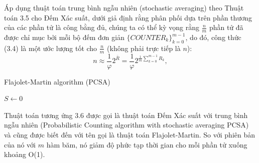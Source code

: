 \documentclass[a4paper,13pt]{article}
\theoremstyle{mytheor}
\begin{document}
Áp dụng thuật toán trung bình ngẫu nhiên (stochastic averaging) theo Thuật toán 3.5 cho Đếm Xác suất, 
dưới giả định rằng phân phối dựa trên phần thương của các phần tử là công bằng đủ, chúng ta có thể kỳ vọng rằng $\frac{n}{m}$ phần tử đã được 
chỉ mục bởi mỗi bộ đếm đơn giản $\{COUNTER_k\}_{k=0}^{m-1}$, do đó, công thức (3.4) là một ước lượng tốt cho $\frac{n}{m}$ (không phải trực tiếp là $n$):
\[n \approx \frac{1}{\varphi}2^{\bar{R}} = \frac{1}{\varphi}2^{\frac{1}{m}{\sum\limits_{k=0}^{m-1}R_k}},\]
\begin{algorithm}[H]
    \DontPrintSemicolon
    \LinesNumberedHidden
    \caption[]{Flajolet-Martin algorithm (PCSA)}
    $S \gets $0
\end{algorithm}
\vspace{0.25cm}
Thuật toán tương ứng 3.6 được gọi là thuật toán Đếm Xác suất với trung bình ngẫu nhiên (Probabilistic Counting algorithm with stochastic averaging PCSA) 
và cũng được biết đến với tên gọi là thuật toán Flajolet-Martin. So với phiên bản của nó với $m$ hàm băm, nó giảm độ phức tạp thời gian cho 
mỗi phần tử xuống khoảng O(1).
\newpage
\end{document}
